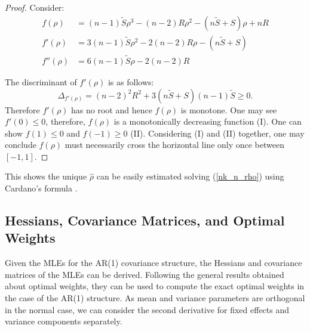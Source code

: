 \documentclass[11pt,a5paper,twoside]{book}
\begin{document}
{\begin{proof}
Consider:
\begin{equation*}
\begin{aligned}
 f(\rho) &= (n-1)\tilde{S}\rho^3 - (n-2) R \rho^2 - (n\tilde{S}+S)\rho + nR\\
 f'(\rho) &= 3(n-1)\tilde{S}\rho^2 - 2(n-2) R\rho - (n\tilde{S}+S)\\
  f''(\rho) &= 6(n-1)\tilde{S}\rho - 2(n-2) R
\end{aligned}
\end{equation*}

The discriminant of $f'(\rho)$ is as follows:
\begin{equation*}
\Delta_{f'(\rho)}=(n-2)^2 R^2 + 3 (n\tilde{S}+S)(n-1) \tilde{S}\geq 0.
\end{equation*}
Therefore $f'(\rho)$ has no root and hence $f(\rho)$ is monotone. One may see $f'(0)\leq 0$, therefore, $f(\rho)$ is a monotonically decreasing function (I). One can show $f(1)\leq 0$ and $f(-1)\geq 0$ (II). Considering (I) and (II) together, one may conclude $f(\rho)$ must necessarily cross the horizontal line only once between $[-1,1]$.
\end{proof}
This shows the unique $\widehat{\rho}$ can be easily estimated solving (\ref{nk_n_rho})  using Cardano's formula \citep{Cardano}.


\subsection{Hessians, Covariance Matrices, and Optimal Weights}

Given the MLEs for the AR(1) covariance structure,  the Hessians and covariance matrices of the MLEs can be derived. Following the general results obtained about optimal weights, they can be used to compute the exact optimal weights in the case of the AR(1) structure. As mean and variance parameters are orthogonal in the normal case, we can consider the second derivative for fixed effects and variance components separately.

}
\end{document}
